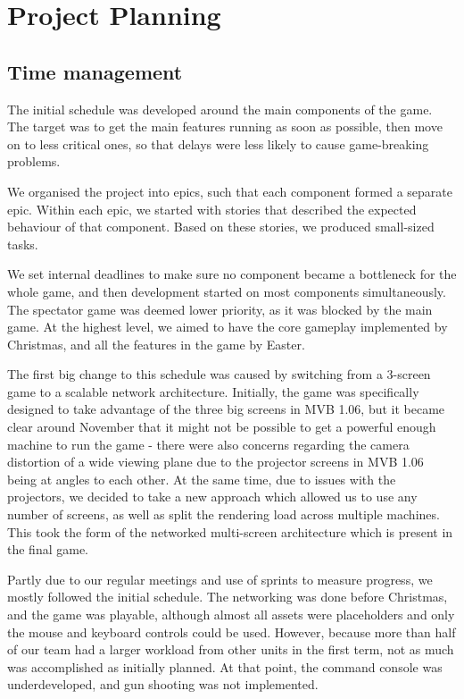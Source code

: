 \documentclass[a4paper,11pt]{article}
\begin{document}
\section{Project Planning}

\subsection{Time management}
The initial schedule was developed around the main components of the game. The target was to get the main features running as soon as possible, then move on to less critical ones, so that delays were less likely to cause game-breaking problems.

We organised the project into epics, such that each component formed a separate epic. Within each epic, we started with stories that described the expected behaviour of that component. Based on these stories, we produced small-sized tasks.

We set internal deadlines to make sure no component became a bottleneck for the whole game, and then development started on most components simultaneously. The spectator game was deemed lower priority, as it was blocked by the main game. At the highest level, we aimed to have the core gameplay implemented by Christmas, and all the features in the game by Easter.

The first big change to this schedule was caused by switching from a 3-screen game to a scalable network architecture. Initially, the game was specifically designed to take advantage of the three big screens in MVB 1.06, but it became clear around November that it might not be possible to get a powerful enough machine to run the game - there were also concerns regarding the camera distortion of a wide viewing plane due to the projector screens in MVB 1.06 being at angles to each other. At the same time, due to issues with the projectors, we decided to take a new approach which allowed us to use any number of screens, as well as split the rendering load across multiple machines. This took the form of the networked multi-screen architecture which is present in the final game.

Partly due to our regular meetings and use of sprints to measure progress, we mostly followed the initial schedule. The networking was done before Christmas, and the game was playable, although almost all assets were placeholders and only the mouse and keyboard controls could be used. However, because more than half of our team had a larger workload from other units in the first term, not as much was accomplished as initially planned. At that point, the command console was underdeveloped, and gun shooting was not implemented.
\end{document}
